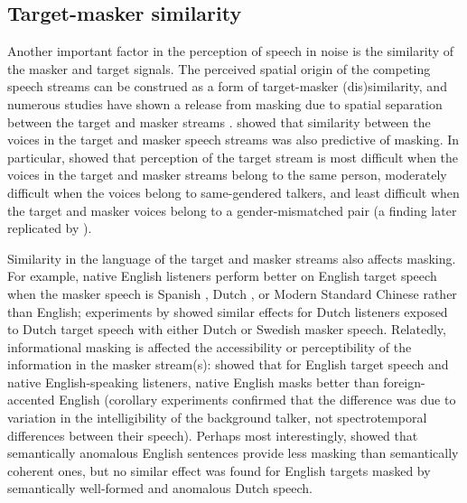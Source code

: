 \subsection{Target-masker similarity}
Another important factor in the perception of speech in noise is the similarity of the masker and target signals.  The perceived spatial origin of the competing speech streams can be construed as a form of target-masker (dis)similarity, and numerous studies have shown a release from masking due to spatial separation between the target and masker streams \citep[e.g.,][]{BrungartSimpson2002, FreymanEtAl1999, FreymanEtAl2004, KiddEtAl2005a, JohnstoneLitovsky2006}.  \citet{Brungart2001} showed that similarity between the voices in the target and masker speech streams was also predictive of masking.  In particular, \citeauthor{Brungart2001} showed that perception of the target stream is most difficult when the voices in the target and masker streams belong to the same person, moderately difficult when the voices belong to same-gendered talkers, and least difficult when the target and masker voices belong to a gender-mismatched pair (a finding later replicated by \citealt{HelferFreyman2008}).  

Similarity in the language of the target and masker streams also affects masking.  For example, native English listeners perform better on English target speech when the masker speech is Spanish \citep{GarciaLecumberriCooke2006}, Dutch \citep{BrouwerEtAl2012}, or Modern Standard Chinese \citep{VanEngenBradlow2007} rather than English; experiments by \citet{RhebergenEtAl2005} showed similar effects for Dutch listeners exposed to Dutch target speech with either Dutch or Swedish masker speech.  Relatedly, informational masking is affected the accessibility or perceptibility of the information in the masker stream(s): \citet{CalandruccioEtAl2010} showed that for English target speech and native English-speaking listeners, native English masks better than foreign-accented English (corollary experiments confirmed that the difference was due to variation in the intelligibility of the background talker, not spectrotemporal differences between their speech).  Perhaps most interestingly, \citet{BrouwerEtAl2012} showed that semantically anomalous English sentences provide less masking than semantically coherent ones, but no similar effect was found for English targets masked by semantically well-formed and anomalous Dutch speech.  %

